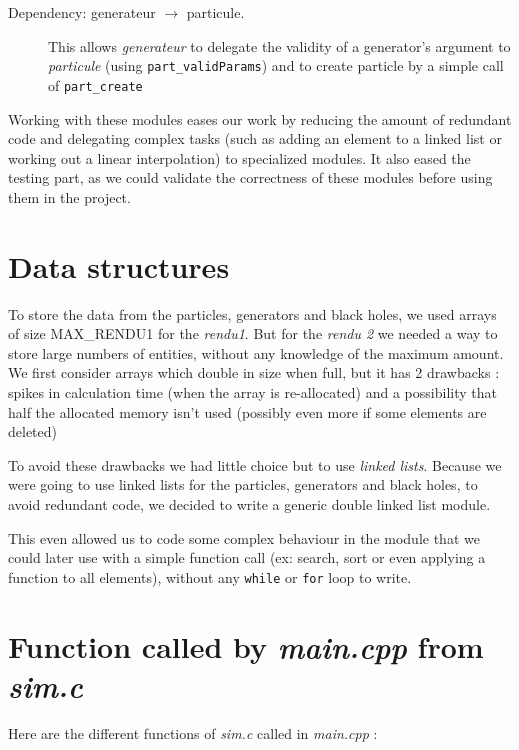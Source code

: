 \documentclass[a4paper]{article} %
\begin{document}
\begin{multicols*}{2}
\begin{description}
\item[Dependency: generateur $\rightarrow$ particule.]
This allows \emph{generateur} to delegate the validity of a generator's argument to \emph{particule}
(using \texttt{part\_validParams}) 
and to create particle by a simple call of \texttt{part\_create}
\end{description}

Working with these modules eases our work by reducing the amount of redundant code and delegating complex tasks
(such as adding an element to a linked list or working out a linear interpolation) to specialized modules.
It also eased the testing part, as we could validate the correctness of these modules before using them in the project.

\section{Data structures}

To store the data from the particles, generators and black holes,
we used arrays of size MAX\_RENDU1 for the \emph{rendu1}.
But for the \emph{rendu 2} we needed a way to store large numbers of entities,
without any knowledge of the maximum amount.
We first consider arrays which double in size when full, but it has 2 drawbacks :
spikes in calculation time (when the array is re-allocated)
and a possibility that half the allocated memory isn't used (possibly even more if some elements are deleted)

To avoid these drawbacks we had little choice but to use \emph{linked lists}.
Because we were going to use linked lists for the particles, generators and black holes, to avoid redundant code,
we decided to write a generic double linked list module.

This even allowed us to code some complex behaviour in the module that we could later use with a simple function call
(ex: search, sort or even applying a function to all elements), without any \texttt{while} or \texttt{for} loop to write.


\section{Function called by \emph{main.cpp} from \emph{sim.c}}
Here are the different functions of \emph{sim.c} called in \emph{main.cpp} :


\end{multicols*}
\end{document}
